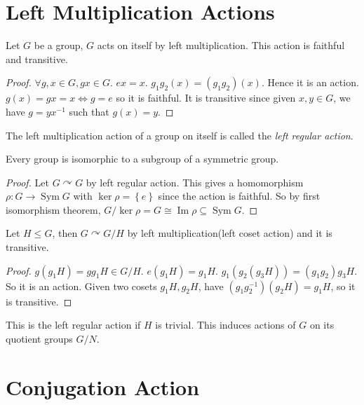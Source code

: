\documentclass[10pt]{article}
\DeclareMathOperator{\im}{Im}
\def\le{\leqslant}
\DeclareMathOperator{\sym}{Sym}
\begin{document}
      \section{Left Multiplication Actions}
      \begin{lemma}\label{lma:5.13}
          Let $G$ be a group, $G$ acts on itself by left multiplication. This action is faithful and transitive.
      \end{lemma}
      \begin{proof}
          $ \forall g,x\in G, gx\in G $. $ ex=x $. $ g_1g_2(x)=(g_1g_2)(x) $. Hence it is an action. $ g(x)=gx=x \Leftrightarrow g=e $ so it is faithful. It is transitive since given $x,y\in G$, we have $g=yx^{-1}$ such that $g(x)=y$.
      \end{proof}
      \begin{definition}
          The left multiplication action of a group on itself is called the \textit{left regular action}.
      \end{definition}
      \begin{theorem}[Cayley]\label{thm:Cayley}
          Every group is isomorphic to a subgroup of a symmetric group.
      \end{theorem}
      \begin{proof}
          Let $ G \curvearrowright G $ by left regular action. This gives a homomorphism $ \rho: G \to \sym G $ with $ \ker \rho=\left\{ e \right\} $ since the action is faithful. So by first isomorphism theorem, $G/\ker \rho=G \cong \im \rho \subseteq \sym G$. 
      \end{proof}
      \begin{proposition}\label{prop:5.16}
          Let $H\le G$, then $G \curvearrowright G/H$ by left multiplication(left coset action) and it is transitive.
      \end{proposition}
      \begin{proof}
          $ g(g_1H)=gg_1H\in G/H $. $ e(g_1H)=g_1H $. $ g_1(g_2(g_3H))=(g_1g_2)g_3H $. So it is an action. Given two cosets $ g_1H,g_2H $, have $ (g_1g_2^{-1})(g_2H)=g_1H $, so it is transitive.
      \end{proof}
      \begin{remark}
          This is the left regular action if $H$ is trivial. This induces actions of $G$ on its quotient groups $G/N$.
      \end{remark}
      \section{Conjugation Action}
\end{document}

